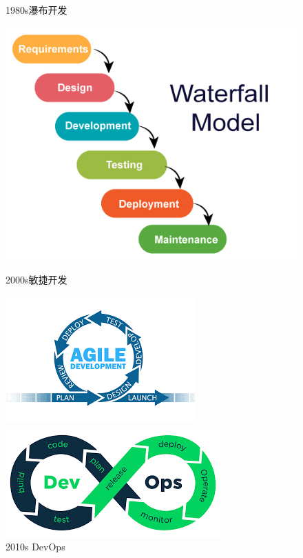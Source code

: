 \begin{figure}[H]
    \begin{center}
        \begin{minipage}{0.3\linewidth}
            \caption{1980s瀑布开发}
            \includegraphics[width=\linewidth]{img/waterfall.png}
        \end{minipage}
        \begin{minipage}{0.3\linewidth}
            \caption{2000s敏捷开发}
            \includegraphics[width=\linewidth]{img/agile.png}
        \end{minipage}
        \begin{minipage}{0.3\linewidth}
            \caption{2010s DevOps}
            \includegraphics[width=\linewidth]{img/devops.png}

\end{minipage}
\end{center}
\end{figure}
